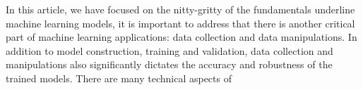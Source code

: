 In this article, we have focused on the nitty-gritty of the fundamentals underline machine learning models, it is important to address that there is another critical part of machine learning applications: data collection and data manipulations. In addition to model construction, training and validation, data collection and manipulations also significantly dictates the accuracy and robustness of the trained models. There are many technical aspects of 